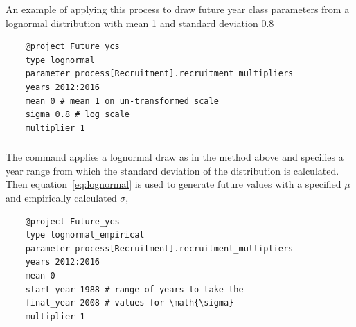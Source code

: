 An example of applying this process to draw future year class parameters from a lognormal distribution with mean 1 and standard deviation 0.8

{\small{\begin{verbatim}
	@project Future_ycs
	type lognormal
	parameter process[Recruitment].recruitment_multipliers
	years 2012:2016
	mean 0 # mean 1 on un-transformed scale
	sigma 0.8 # log scale
	multiplier 1
\end{verbatim}}}

\subsubsection{}
 \label{sec:Project-LogNormalEmpirical} 

The  command applies a lognormal draw as in the  method above and specifies a year range from which the standard deviation of the distribution is calculated. Then equation~\eqref{eq:lognormal} is used to generate future values with a specified $\mu$ and empirically calculated $\sigma$,

{\small{\begin{verbatim}
	@project Future_ycs
	type lognormal_empirical
	parameter process[Recruitment].recruitment_multipliers
	years 2012:2016
	mean 0
	start_year 1988 # range of years to take the
	final_year 2008 # values for \math{\sigma}
	multiplier 1
\end{verbatim}}}




